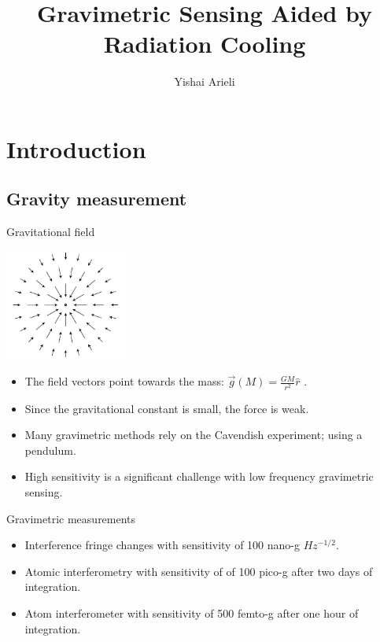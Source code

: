 \documentclass{beamer}
\title[Gravimetric Sensing Aided by Radiation Cooling]{Gravimetric Sensing Aided by Radiation Cooling}
\author[Yishai Arieli]{Yishai Arieli}
\begin{document}
	\typesetFrontSlides

\section{Introduction}



\subsection{Gravity measurement}
\begin{frame}{\hypertarget{frame:Gravitational field}{Gravitational field}}
	\begin{center}		
		\includegraphics[width=0.3\textwidth,keepaspectratio]{gravity.png}
    \end{center}
	\begin{itemize}
		\item The field vectors point towards the mass: $\overrightarrow{g}(M) = \frac{GM}{r^2}\hat{r}$ .
		\item Since the gravitational constant is small, the force is weak.
		\item Many gravimetric methods rely on the Cavendish experiment; using a pendulum.
		\item High sensitivity is a significant challenge with low frequency gravimetric sensing.
		\end{itemize}
\end{frame}

\begin{frame}{Gravimetric measurements}
	
	\begin{itemize}

		\item Interference fringe changes with sensitivity of 100 nano-g $Hz^{-1/2}$.
		\item Atomic interferometry with sensitivity of of 100 pico-g after two days of integration.
		\item Atom interferometer with sensitivity of 500 femto-g after one hour of integration.
		
	\end{itemize}
\end{frame}
\end{document}
